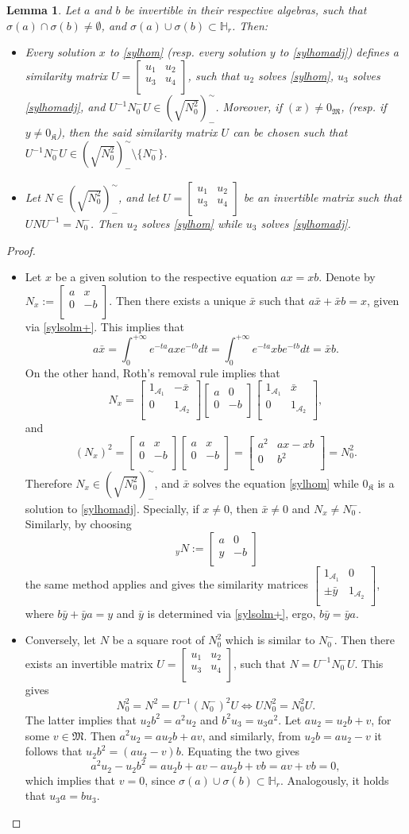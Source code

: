 \documentclass{article}
\newtheorem{lemma}{Lemma}[section]
\theoremstyle{definition}
\def\A{{\mathcal{A}}}
\def\M{\mathfrak{M}}
\def\K{\mathfrak{K}}
\def\HR{\mathbb{H}_r}
\newcommand{\mat}[4]{\left[\begin{array}{cc}#1 & #2 \\ #3 & #4 \\
	\end{array}\right]}
\begin{document}
 
\begin{lemma}\label{homsylsqrtM} Let $a$ and $b$ be invertible in their respective algebras, such that $\sigma(a)\cap\sigma(b)\neq\emptyset$, and $\sigma(a)\cup\sigma(b)\subset\HR$. Then:
\begin{itemize}
\item[(a)] Every solution $x$ to \eqref{sylhom} (resp. every solution $y$ to \eqref{sylhomadj}) defines a similarity matrix $U=\mat{u_1}{u_2}{u_3}{u_4}$, such that $u_2$ solves \eqref{sylhom}, $u_3$ solves \eqref{sylhomadj}, and $U^{-1}N^-_0U\in\left(\sqrt{N_0^2}\right)^{\sim}_{-}$. Moreover, if $(x)\neq 0_\M$, (resp. if $y\neq 0_\K$), then the said similarity matrix $U$ can be chosen such that $U^{-1}N^-_0U\in\left(\sqrt{N_0^2}\right)^{\sim}_{-}\setminus\{N_0^-\}$.
\item[(b)] Let $N\in\left(\sqrt{N_0^2}\right)^{\sim}_{-}$, and let $U=\mat{u_1}{u_2}{u_3}{u_4}$ be an invertible matrix such that $UNU^{-1}=N^-_0$. Then $u_2$ solves \eqref{sylhom} while $u_3$ solves \eqref{sylhomadj}.
\end{itemize}
\end{lemma}
\begin{proof}
\begin{itemize}
\item[(a)] Let $x$ be a given solution to the respective equation $ax=xb$. Denote by $N_x:=\mat{a}{x}{0}{-b}$. Then there exists a unique $\bar x$ such that $a\bar x+\bar xb=x$,   given via \eqref{sylsolm+}. This implies that
$$a\bar x=\int_0^{+\infty}e^{-ta}axe^{-tb}dt=\int_0^{+\infty}e^{-ta}xbe^{-tb}dt=\bar x b.$$ On the other hand, Roth's removal rule implies that
$$N_x=\mat{1_{\A_1}}{-\bar x}{0}{1_{\A_2}}\mat{a}{0}{0}{-b}\mat{1_{\A_1}}{\bar x}{0}{1_{\A_2}},$$
and
$$\left(N_x\right)^2=\mat{a}{x}{0}{-b}\mat{a}{x}{0}{-b}=\mat{a^2}{ax-xb}{0}{b^2}=N_0^2.$$
Therefore $N_x\in\left(\sqrt{N_0^2}\right)^{\sim}_{-}$, and $\bar x$ solves the equation \eqref{sylhom} while $0_\K$ is a solution to \eqref{sylhomadj}. Specially, if $x\neq0$, then $\bar x\neq0$ and $N_x\neq N_0^-$. Similarly, by choosing 
$$\ _yN:=\mat{a}{0}{y}{-b}$$
the same method applies and gives the similarity matrices $\mat{1_{\A_1}}{0}{\pm\bar y}{1_{\A_2}}$, where $b\bar y+\bar ya=y$ and $\bar y$ is determined via \eqref{sylsolm+}, ergo, $b\bar{y}=\bar{y}a$.
\item[(b)] Conversely, let $N$ be a square root of $N_0^2$ which is similar to $N^-_0$. Then there exists an invertible matrix $U=\mat{u_1}{u_2}{u_3}{u_4}$, such that $N=U^{-1}N^-_0U$. This gives
$$N_0^2=N^2=U^{-1}(N^-_0)^2U\Leftrightarrow UN_0^2=N_0^2U.$$
The latter implies that 
$u_2b^2=a^2u_2$ and $b^2u_3=u_3a^2$. Let $au_2=u_2b+v$, for some $v\in\M$. Then $a^2u_2=au_2b+av$, and similarly, from $u_2b=au_2-v$ it follows that $u_2b^2=(au_2-v)b$. Equating the two gives $$a^2u_2-u_2b^2=au_2b+av-au_2b+vb=av+vb=0,$$ which implies that $v=0$, since $\sigma(a)\cup\sigma(b)\subset\HR$. Analogously, it holds that $u_3a=bu_3$.
\end{itemize}
\end{proof}
\end{document}
